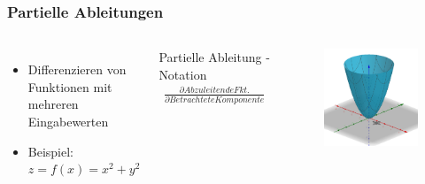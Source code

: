 \begin{frame}
\frametitle{Partielle Ableitungen}

\begin{columns}

\begin{itemize}
\item Differenzieren von Funktionen mit mehreren Eingabewerten
\item Beispiel: $z = f(x) = x^2 + y^2$
\end{itemize}

\hspace{2mm}

\begin{block}{Partielle Ableitung - Notation}
\begin{align*}
\frac{\partial Abzuleitende Fkt.}{\partial Betrachtete Komponente}
\end{align*}
\end{block}

\begin{figure}
\includegraphics[width=\linewidth]{./geschichtliches/adeline/img/partAbl_1_alpha}
\end{figure}

\end{columns}
\end{frame}



